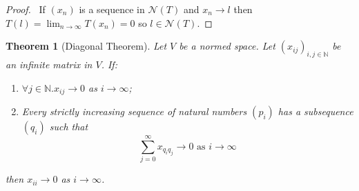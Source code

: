 \documentclass{book}
\let\qed\relax
\newtheorem{thm}[ax]{Theorem}
\theoremstyle{definition}
\begin{document}
\begin{proof}
\pf\ If $(x_n)$ is a sequence in $\mathcal{N}(T)$ and $x_n \rightarrow l$ then $T(l) = \lim_{n \rightarrow \infty} T(x_n) = 0$ so $l \in \mathcal{N}(T)$. \qed
\end{proof}

\begin{thm}[Diagonal Theorem]
Let $V$ be a normed space. Let $(x_{ij})_{i,j \in \mathbb{N}}$ be an infinite matrix in $V$. If:
\begin{enumerate}
\item
$\forall j \in \mathbb{N}. x_{ij} \rightarrow 0$ as $i \rightarrow \infty$;
\item Every strictly increasing sequence of natural numbers $(p_i)$ has a subsequence $(q_i)$ such that
\[ \sum_{j=0}^\infty x_{q_iq_j} \rightarrow 0 \text{ as } i \rightarrow \infty \]
\end{enumerate}
then $x_{ii} \rightarrow 0$ as $i \rightarrow \infty$.
\end{thm}
\end{document}
